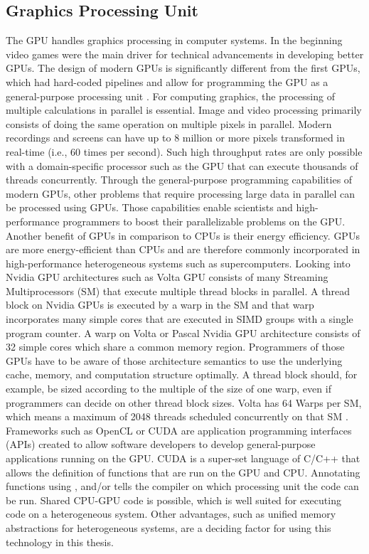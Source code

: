 \subsection{Graphics Processing Unit}
The GPU handles graphics processing in computer systems. In the beginning video games were the main driver for technical advancements in developing better GPUs. The design of modern GPUs is significantly different from the first GPUs, which had hard-coded pipelines and allow for programming the GPU as a general-purpose processing unit \cite{nickolls_gpu_2010}. For computing graphics, the processing of multiple calculations in parallel is essential. Image and video processing primarily consists of doing the same operation on multiple pixels in parallel. Modern recordings and screens can have up to 8 million or more pixels transformed in real-time (i.e., 60 times per second). Such high throughput rates are only possible with a domain-specific processor such as the GPU that can execute thousands of threads concurrently.
Through the general-purpose programming capabilities of modern GPUs, other problems that require processing large data in parallel can be processed using GPUs. Those capabilities enable scientists and high-performance programmers to boost their parallelizable problems on the GPU.
Another benefit of GPUs in comparison to CPUs is their energy efficiency. GPUs are more energy-efficient than CPUs and are therefore commonly incorporated in high-performance heterogeneous systems such as supercomputers.
Looking into Nvidia GPU architectures such as Volta \cite{NVIDIATESLAV1002017} GPU consists of many Streaming Multiprocessors (SM) that execute multiple thread blocks in parallel. A thread block on Nvidia GPUs is executed by a warp in the SM and that warp incorporates many simple cores that are executed in SIMD groups with a single program counter. A warp on Volta or Pascal Nvidia GPU architecture consists of 32 simple cores which share a common memory region. Programmers of those GPUs have to be aware of those architecture semantics to use the underlying cache, memory, and computation structure optimally. A thread block should, for example, be sized according to the multiple of the size of one warp, even if programmers can decide on other thread block sizes. Volta has 64 Warps per SM, which means a maximum of 2048 threads scheduled concurrently on that SM \cite{noauthor_nvidia_2017}.
Frameworks such as OpenCL or CUDA are application programming interfaces (APIs) created to allow software developers to develop general-purpose applications running on the GPU. CUDA is a super-set language of C/C++ that allows the definition of functions that are run on the GPU and CPU. Annotating functions using \texttt{}, \texttt{} and/or \texttt{} tells the compiler on which processing unit the code can be run. Shared CPU-GPU code is possible, which is well suited for executing code on a heterogeneous system. Other advantages, such as unified memory abstractions for heterogeneous systems, are a deciding factor for using this technology in this thesis.

